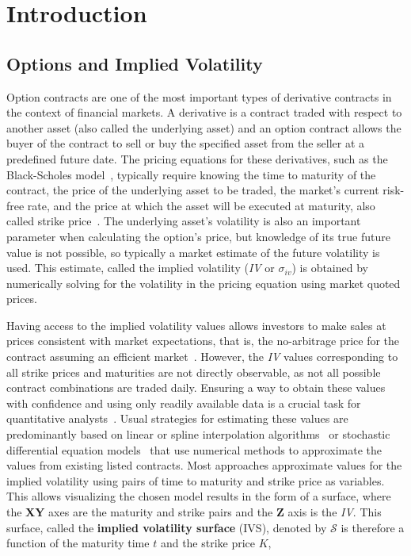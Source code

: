 \section{Introduction}
\label{sec:introduction}

\subsection{Options and Implied Volatility}
\label{subsec:ivs}

Option contracts are one of the most important types of derivative contracts in the context of financial markets.
A derivative is a contract traded with respect to another asset (also called the underlying asset)
and an option contract allows the buyer of the contract to sell or buy the specified asset from the seller at a predefined future date.
The pricing equations for these derivatives, such as the Black-Scholes model~\cite{Black1973}, typically require knowing the time to maturity of the contract,
the price of the underlying asset to be traded, the market's current risk-free rate, and the price at which the asset will be executed at maturity, also called strike price~\cite{Hull2018}.
The underlying asset's volatility is also an important parameter when calculating the option's price,
but knowledge of its true future value is not possible, so typically a market estimate of the future volatility is used.
This estimate, called the implied volatility (\textit{IV} or $\sigma_{iv}$) is obtained
by numerically solving for the volatility in the pricing equation using market quoted prices.

Having access to the implied volatility values allows investors to make sales at prices consistent with market expectations,
that is, the no-arbitrage price for the contract assuming an efficient market~\cite{Hull2018}.
However, the \textit{IV} values corresponding to all strike prices and maturities are not directly observable,
as not all possible contract combinations are traded daily.
Ensuring a way to obtain these values with confidence and using only readily available data is a crucial task for quantitative analysts~\cite{Kim2006}.
Usual strategies for estimating these values are predominantly based on linear or spline interpolation
algorithms~\cite{Homescu2011} or stochastic differential equation models~\cite{Jordan2011}
that use numerical methods to approximate the values from existing listed contracts.
Most approaches approximate values for the implied volatility using pairs of time to maturity and strike price as variables.
This allows visualizing the chosen model results in the form of a surface,
where the \textbf{XY} axes are the maturity and strike pairs and the \textbf{Z} axis is the \textit{IV}.
This surface, called the \textbf{implied volatility surface} (IVS), denoted by $\mathcal{S}$ is therefore a function of the maturity time $t$ and the strike price $K$,

